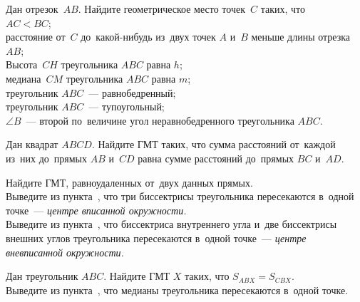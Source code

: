 \begin{problems}

\item
Дан отрезок~$AB$.
Найдите геометрическое место точек~$C$ таких, что
\\
\subproblem $AC < BC$;
\\
\subproblem
расстояние от~$C$ до~какой-нибудь из~двух точек $A$ и~$B$ меньше длины
отрезка~$AB$;
\\
\subproblem
Высота~$CH$ треугольника $ABC$ равна $h$;
\\
\subproblem
медиана~$CM$ треугольника $ABC$ равна $m$;
\\
\subproblem
треугольник $ABC$~--- равнобедренный;
\\
\subproblem
треугольник $ABC$~--- тупоугольный;
\\
\subproblem
$\angle B$~--- второй по~величине угол неравнобедренного треугольника $ABC$.



\item
Дан квадрат $ABCD$.
Найдите ГМТ таких, что сумма расстояний от~каждой из~них до~прямых $AB$ и~$CD$
равна сумме расстояний до~прямых $BC$ и~$AD$.

\item
\subproblem{}%
Найдите ГМТ, равноудаленных от~двух данных прямых.
\\
\subproblem
Выведите из пункта~,
что три биссектрисы треугольника пересекаются в~одной точке~---
\emph{центре вписанной окружности.}
\\
\subproblem
Выведите из пункта~,
что биссектриса внутреннего угла и~две биссектрисы внешних углов
треугольника пересекаются в~одной точке~---
\emph{центре вневписанной окружности.}

\item
\subproblem{}%
Дан треугольник $ABC$.
Найдите ГМТ $X$ таких, что $S_{ABX} = S_{CBX}$.
\\
\subproblem
Выведите из пункта~,
что медианы треугольника пересекаются в~одной точке.


\end{problems}
